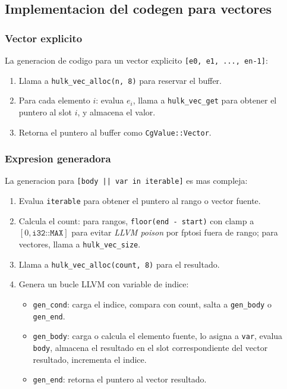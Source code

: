 \documentclass[12pt,a4paper]{article}
\begin{document}
\subsection{Implementacion del codegen para vectores}

\subsubsection{Vector explicito}

La generacion de codigo para un vector explicito \texttt{[e0, e1, ..., en-1]}:

\begin{enumerate}
  \item Llama a \texttt{hulk\_vec\_alloc(n, 8)} para reservar el buffer.
  \item Para cada elemento $i$: evalua $e_i$, llama a \texttt{hulk\_vec\_get} para
    obtener el puntero al slot $i$, y almacena el valor.
  \item Retorna el puntero al buffer como \texttt{CgValue::Vector}.
\end{enumerate}

\subsubsection{Expresion generadora}

La generacion para \texttt{[body || var in iterable]} es mas compleja:

\begin{enumerate}
  \item Evalua \texttt{iterable} para obtener el puntero al rango o vector fuente.
  \item Calcula el count: para rangos, \texttt{floor(end - start)} con clamp a
    $[0, \texttt{i32::MAX}]$ para evitar \textit{LLVM poison} por fptosi fuera
    de rango; para vectores, llama a \texttt{hulk\_vec\_size}.
  \item Llama a \texttt{hulk\_vec\_alloc(count, 8)} para el resultado.
  \item Genera un bucle LLVM con variable de indice:
    \begin{itemize}
      \item \texttt{gen\_cond}: carga el indice, compara con count, salta a
        \texttt{gen\_body} o \texttt{gen\_end}.
      \item \texttt{gen\_body}: carga o calcula el elemento fuente, lo asigna a
        \texttt{var}, evalua \texttt{body}, almacena el resultado en el slot
        correspondiente del vector resultado, incrementa el indice.
      \item \texttt{gen\_end}: retorna el puntero al vector resultado.
    \end{itemize}
\end{enumerate}
\end{document}
